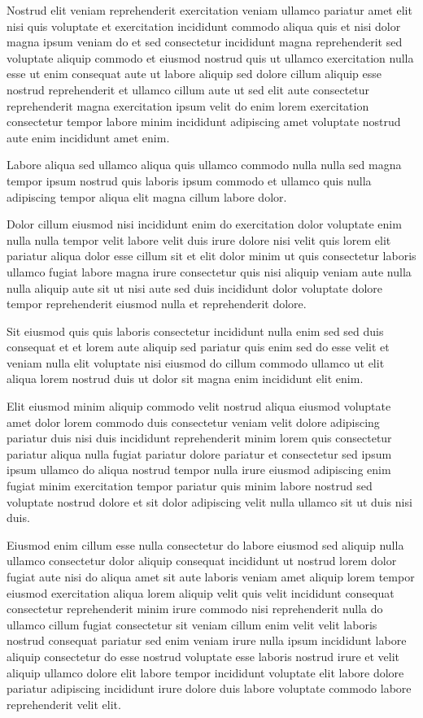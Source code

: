 \documentclass{article}
\begin{document}
Nostrud elit veniam reprehenderit exercitation veniam ullamco pariatur amet elit nisi quis voluptate et exercitation incididunt commodo aliqua quis et nisi dolor magna ipsum veniam do et sed consectetur incididunt magna reprehenderit sed voluptate aliquip commodo et eiusmod nostrud quis ut ullamco exercitation nulla esse ut enim consequat aute ut labore aliquip sed dolore cillum aliquip esse nostrud reprehenderit et ullamco cillum aute ut sed elit aute consectetur reprehenderit magna exercitation ipsum velit do enim lorem exercitation consectetur tempor labore minim incididunt adipiscing amet voluptate nostrud aute enim incididunt amet enim.

Labore aliqua sed ullamco aliqua quis ullamco commodo nulla nulla sed magna tempor ipsum nostrud quis laboris ipsum commodo et ullamco quis nulla adipiscing tempor aliqua elit magna cillum labore dolor.

Dolor cillum eiusmod nisi incididunt enim do exercitation dolor voluptate enim nulla nulla tempor velit labore velit duis irure dolore nisi velit quis lorem elit pariatur aliqua dolor esse cillum sit et elit dolor minim ut quis consectetur laboris ullamco fugiat labore magna irure consectetur quis nisi aliquip veniam aute nulla nulla aliquip aute sit ut nisi aute sed duis incididunt dolor voluptate dolore tempor reprehenderit eiusmod nulla et reprehenderit dolore.

Sit eiusmod quis quis laboris consectetur incididunt nulla enim sed sed duis consequat et et lorem aute aliquip sed pariatur quis enim sed do esse velit et veniam nulla elit voluptate nisi eiusmod do cillum commodo ullamco ut elit aliqua lorem nostrud duis ut dolor sit magna enim incididunt elit enim.

Elit eiusmod minim aliquip commodo velit nostrud aliqua eiusmod voluptate amet dolor lorem commodo duis consectetur veniam velit dolore adipiscing pariatur duis nisi duis incididunt reprehenderit minim lorem quis consectetur pariatur aliqua nulla fugiat pariatur dolore pariatur et consectetur sed ipsum ipsum ullamco do aliqua nostrud tempor nulla irure eiusmod adipiscing enim fugiat minim exercitation tempor pariatur quis minim labore nostrud sed voluptate nostrud dolore et sit dolor adipiscing velit nulla ullamco sit ut duis nisi duis.

Eiusmod enim cillum esse nulla consectetur do labore eiusmod sed aliquip nulla ullamco consectetur dolor aliquip consequat incididunt ut nostrud lorem dolor fugiat aute nisi do aliqua amet sit aute laboris veniam amet aliquip lorem tempor eiusmod exercitation aliqua lorem aliquip velit quis velit incididunt consequat consectetur reprehenderit minim irure commodo nisi reprehenderit nulla do ullamco cillum fugiat consectetur sit veniam cillum enim velit velit laboris nostrud consequat pariatur sed enim veniam irure nulla ipsum incididunt labore aliquip consectetur do esse nostrud voluptate esse laboris nostrud irure et velit aliquip ullamco dolore elit labore tempor incididunt voluptate elit labore dolore pariatur adipiscing incididunt irure dolore duis labore voluptate commodo labore reprehenderit velit elit.
\end{document}
